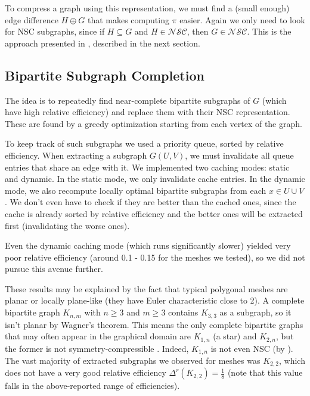 \documentclass{egpubl}
\begin{document}
To compress a graph using this representation,
we must find a (small enough) edge difference $H \oplus G$ that makes computing $\pi$ easier.
Again we only need to look for NSC subgraphs, since
if $H \subseteq G$ and $H \in \mathcal{N}\mathcal{S}\mathcal{C}$, then $G \in \mathcal{N}\mathcal{S}\mathcal{C}$. This is the approach presented in \cite[Algorithm 2]{cibej2021automorphisms}, described in the next section.

\subsection{Bipartite Subgraph Completion} \label{sec:bipartite}

The idea is to repeatedly find near-complete bipartite subgraphs of $G$ (which have high relative efficiency) and replace them with their NSC representation. These are found by a greedy optimization starting from each vertex of the graph.

To keep track of such subgraphs we used a priority queue, sorted by relative efficiency. When extracting a subgraph $G(U,V)$, we must invalidate all queue entries that share an edge with it. 
We implemented two caching modes: static and dynamic. In the static mode, we only invalidate cache entries. In the dynamic mode, we also recompute locally optimal bipartite subgraphs from each $x \in U \cup V$. We don't even have to check if they are better than the cached ones, since the cache is already sorted by relative efficiency and the better ones will be extracted first (invalidating the worse ones).

Even the dynamic caching mode (which runs significantly slower) yielded very poor relative efficiency
(around 0.1 - 0.15 for the meshes we tested), so we did not pursue this avenue further.

These results may be explained by the fact that typical polygonal meshes are planar or locally plane-like (they have Euler characteristic close to 2). A complete bipartite graph $K_{n,m}$ with $n \geq 3$ and $m \geq 3$ contains $K_{3,3}$ as a subgraph, so it isn't planar by Wagner's theorem.
This means the only complete bipartite graphs that may often appear in the graphical domain are $K_{1,n}$ (a star) and $K_{2,n}$, but the former
is not symmetry-compressible \cite[Theorem 2]{cibej2021automorphisms}. Indeed, $K_{1,n}$ is not even NSC (by \cite[Theorem 6]{cibej2021automorphisms}).
The vast majority of extracted subgraphs we observed for meshes was $K_{2,2}$, which does not have a very good relative efficiency $\Delta^r(K_{2,2}) = \frac{1}{8}$ (note that this value falls in the above-reported range of efficiencies).
\end{document}
